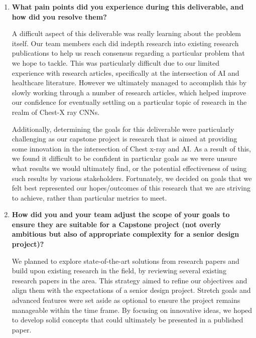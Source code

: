 \documentclass{article}
\begin{document}
\begin{enumerate}
    \item \textbf{What pain points did you experience during this deliverable, and how
    did you resolve them?}
    \begin{itemize}
    \begin{item}
        A difficult aspect of this deliverable was really learning about the problem itself. Our team members each did indepth research into existing research publications to help us reach consensus regarding a particular problem that we hope to tackle. This was particularly difficult due to our limited experience with research articles, specifically at the intersection of AI and healthcare literature. However we ultimately managed to accomplish this by slowly working through a number of research articles, which helped improve our confidence for eventually settling on a particular topic of research in the realm of Chest-X ray CNNs.
    \end{item}
    \begin{item}
        Additionally, determining the goals for this deliverable were particularly challenging as our capstone project is research that is aimed at providing some innovation in the intersection of Chest x-ray and AI. As a result of this, we found it difficult to be confident in particular goals as we were unsure what results we would ultimately find, or the potential effectiveness of using such results by various stakeholders. Fortunately, we decided on goals that we felt best represented our hopes/outcomes of this research that we are striving to achieve, rather than particular metrics to meet.
    \end{item}
    \end{itemize}
    \item \textbf{How did you and your team adjust the scope of your goals to ensure
    they are suitable for a Capstone project (not overly ambitious but also of
    appropriate complexity for a senior design project)?}

    We planned to explore state-of-the-art solutions from research papers and build upon existing research in the field, by reviewing several existing research papers in the area. This strategy aimed to refine our objectives and align them with the expectations of a senior design project. Stretch goals and advanced features were set aside as optional to ensure the project remains manageable within the time frame. By focusing on innovative ideas, we hoped to develop solid concepts that could ultimately be presented in a published paper.


\end{enumerate}
\end{document}

